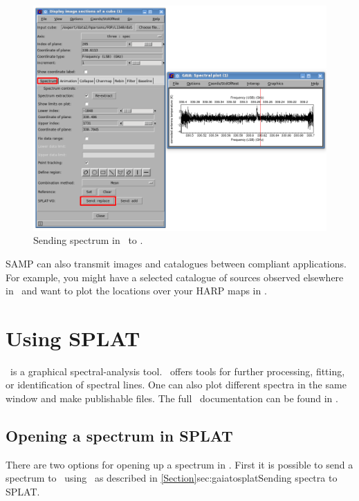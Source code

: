 \documentclass[11pt,oneside,chapters]{starlink}
\providecommand{\splatsun}{\xref{\textbf{SUN/243}}{sun243}{}}
\begin{document}
\begin{figure}[h!]
\begin{center}
\includegraphics[width=0.9\linewidth]{sc20_gaia_to_splat}
\caption[Sending spectrum in \gaia\ to \splat.]{\label{fig:gaia_to_splat}
  Sending spectrum in \gaia\ to \splat.}
\end{center}
\end{figure}

SAMP can also transmit images and catalogues between compliant
applications.  For example, you might have a selected catalogue of
sources observed elsewhere in \topcat\ and want to plot the locations
over your HARP maps in \gaia.


\clearpage
\chapter{Using SPLAT}
\label{sec:splat}

\splat\ is a graphical spectral-analysis tool. \splat\ offers tools for
further processing, fitting, or identification of spectral lines.
One can also plot different spectra in the same window and
make publishable files. The full \splat\ documentation can be found
in \splatsun.

\section{Opening a spectrum in SPLAT}
\label{sec:splat-open}

There are two options for opening up a spectrum in \splat. First it is
possible to send a spectrum to \splat\ using \gaia\ as described in
\cref{Section}{sec:gaiatosplat}{Sending spectra to SPLAT}.
\end{document}
